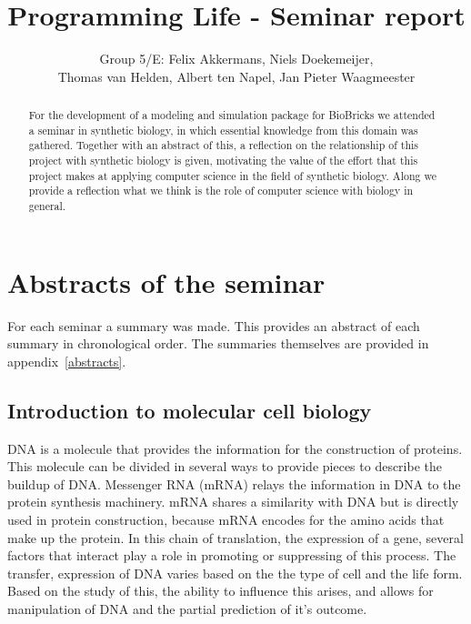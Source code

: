 \documentclass[a4paper]{article}
\title{Programming Life - Seminar report}
\author{
Group 5/E: 
 Felix Akkermans,  
Niels Doekemeijer, \\
Thomas van Helden, 
Albert ten Napel,
Jan Pieter Waagmeester 
}
\begin{document}
\maketitle

\begin{abstract}
\noindent For the  development of a modeling and simulation package for BioBricks we attended a seminar in synthetic biology, in which essential knowledge from this domain was gathered. Together with an abstract of  this, a reflection on the relationship of this project with synthetic biology is given, motivating the value of the effort that this project makes at applying computer science in the field of synthetic biology. Along we provide a reflection what we think is the role of computer science with biology in general.
\end{abstract}

\section{Abstracts of the seminar}
For each seminar a summary was made. This provides an abstract of each summary in chronological order. The summaries themselves are provided in appendix~\ref{abstracts}.

\subsection{Introduction to molecular cell biology}
DNA is a molecule that provides the information for the construction of proteins. This molecule can be divided in several ways to provide pieces to describe the buildup of DNA. Messenger RNA (mRNA) relays the information in DNA to the protein synthesis machinery. mRNA shares a similarity with DNA but is directly used in protein construction, because mRNA encodes for the amino acids that  make up the protein. In this chain of translation, the expression of a gene, several factors that interact play a role in promoting or suppressing of this process. The transfer, expression of DNA varies based on the the type of cell and the life form. Based on the study of this, the ability to influence this arises, and allows for manipulation of DNA and the partial prediction of it's outcome. 
\end{document}
